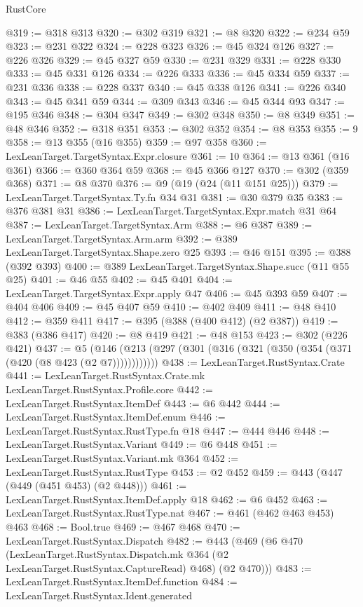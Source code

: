 \begin{lexlean}{RustCore}
\begin{coremodule}
@319 := @318 @313
@320 := @302 @319
@321 := @8 @320
@322 := @234 @59
@323 := @231 @322
@324 := @228 @323
@326 := @45 @324 @126
@327 := @226 @326
@329 := @45 @327 @59
@330 := @231 @329
@331 := @228 @330
@333 := @45 @331 @126
@334 := @226 @333
@336 := @45 @334 @59
@337 := @231 @336
@338 := @228 @337
@340 := @45 @338 @126
@341 := @226 @340
@343 := @45 @341 @59
@344 := @309 @343
@346 := @45 @344 @93
@347 := @195 @346
@348 := @304 @347
@349 := @302 @348
@350 := @8 @349
@351 := @48 @346
@352 := @318 @351
@353 := @302 @352
@354 := @8 @353
@355 := 9
@358 := @13 @355 (@16 @355)
@359 := @97 @358
@360 := LexLeanTarget.TargetSyntax.Expr.closure
@361 := 10
@364 := @13 @361 (@16 @361)
@366 := @360 @364 @59
@368 := @45 @366 @127
@370 := @302 (@359 @368)
@371 := @8 @370
@376 := @9 (@19 (@24 (@11 @151 @25)))
@379 := LexLeanTarget.TargetSyntax.Ty.fn @34 @31
@381 := @30 @379 @35
@383 := @376 @381 @31
@386 := LexLeanTarget.TargetSyntax.Expr.match @31 @64
@387 := LexLeanTarget.TargetSyntax.Arm
@388 := @6 @387
@389 := LexLeanTarget.TargetSyntax.Arm.arm
@392 := @389 LexLeanTarget.TargetSyntax.Shape.zero @25
@393 := @46 @151
@395 := @388 (@392 @393)
@400 := @389 LexLeanTarget.TargetSyntax.Shape.succ (@11 @55 @25)
@401 := @46 @55
@402 := @45 @401
@404 := LexLeanTarget.TargetSyntax.Expr.apply @47
@406 := @45 @393 @59
@407 := @404 @406
@409 := @45 @407 @59
@410 := @402 @409
@411 := @48 @410
@412 := @359 @411
@417 := @395 (@388 (@400 @412) (@2 @387))
@419 := @383 (@386 @417)
@420 := @8 @419
@421 := @48 @153
@423 := @302 (@226 @421)
@437 := @5 (@146 (@213 (@297 (@301 (@316 (@321 (@350 (@354 (@371 (@420 (@8 @423 (@2 @7))))))))))))
@438 := LexLeanTarget.RustSyntax.Crate
@441 := LexLeanTarget.RustSyntax.Crate.mk LexLeanTarget.RustSyntax.Profile.core
@442 := LexLeanTarget.RustSyntax.ItemDef
@443 := @6 @442
@444 := LexLeanTarget.RustSyntax.ItemDef.enum
@446 := LexLeanTarget.RustSyntax.RustType.fn @18
@447 := @444 @446
@448 := LexLeanTarget.RustSyntax.Variant
@449 := @6 @448
@451 := LexLeanTarget.RustSyntax.Variant.mk @364
@452 := LexLeanTarget.RustSyntax.RustType
@453 := @2 @452
@459 := @443 (@447 (@449 (@451 @453) (@2 @448)))
@461 := LexLeanTarget.RustSyntax.ItemDef.apply @18
@462 := @6 @452
@463 := LexLeanTarget.RustSyntax.RustType.nat
@467 := @461 (@462 @463 @453) @463
@468 := Bool.true
@469 := @467 @468
@470 := LexLeanTarget.RustSyntax.Dispatch
@482 := @443
    (@469
      (@6
        @470
        (LexLeanTarget.RustSyntax.Dispatch.mk @364 (@2 LexLeanTarget.RustSyntax.CaptureRead) @468)
        (@2 @470)))
@483 := LexLeanTarget.RustSyntax.ItemDef.function
@484 := LexLeanTarget.RustSyntax.Ident.generated

\end{coremodule}
\end{lexlean}
